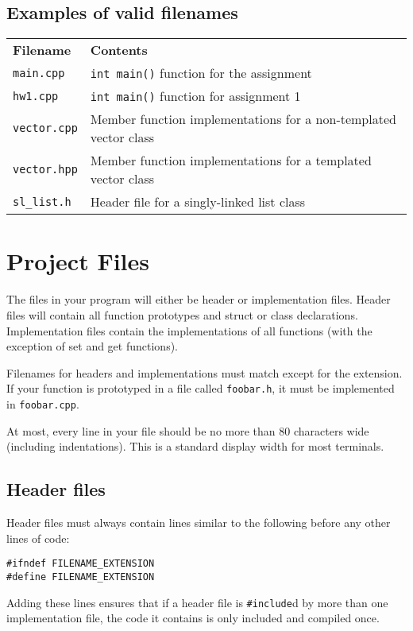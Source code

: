 \documentclass{article}
\newcommand{\code}[1]{\texttt{\colorbox{gray!30}{#1}}}
\begin{document}
\subsection{Examples of valid filenames}
\begin{tabular}{ll}
	\textbf{Filename} & \textbf{Contents} \\
	\code{main.cpp} & \code{int main()} function for the assignment \\
	\code{hw1.cpp} & \code{int main()} function for assignment 1 \\
	\code{vector.cpp} & Member function implementations for a non-templated vector class \\
	\code{vector.hpp} & Member function implementations for a templated vector class \\
	\code{sl\_list.h} & Header file for a singly-linked list class \\
\end{tabular}

\section{Project Files}
The files in your program will either be header or implementation files.
Header files will contain all function prototypes and struct or class declarations.
Implementation files contain the implementations of all functions (with the exception of set and get functions).

Filenames for headers and implementations must match except for the extension.
If your function is prototyped in a file called \code{foobar.h}, it must be implemented in \code{foobar.cpp}.

At most, every line in your file should be no more than 80 characters wide (including indentations).
This is a standard display width for most terminals.

\subsection{Header files}
Header files must always contain lines similar to the following before any other lines of code:
\begin{lstlisting}
#ifndef FILENAME_EXTENSION
#define FILENAME_EXTENSION
\end{lstlisting}

Adding these lines ensures that if a header file is \code{\#include}d by more than one implementation file, the code it contains is only included and compiled once.
\end{document}
